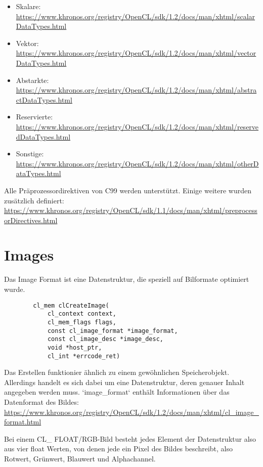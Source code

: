 		\begin{itemize}
		\item Skalare:\\ \url{https://www.khronos.org/registry/OpenCL/sdk/1.2/docs/man/xhtml/scalarDataTypes.html}
		\item Vektor:\\ \url{https://www.khronos.org/registry/OpenCL/sdk/1.2/docs/man/xhtml/vectorDataTypes.html}
		\item Abstarkte:\\ \url{https://www.khronos.org/registry/OpenCL/sdk/1.2/docs/man/xhtml/abstractDataTypes.html}
		\item Reservierte:\\ \url{https://www.khronos.org/registry/OpenCL/sdk/1.2/docs/man/xhtml/reservedDataTypes.html}
		\item Sonstige:\\ \url{https://www.khronos.org/registry/OpenCL/sdk/1.2/docs/man/xhtml/otherDataTypes.html}
		\end{itemize}		
		
		Alle Präprozessordirektiven von C99 werden unterstützt. Einige weitere wurden zusätzlich definiert:\\ \url{https://www.khronos.org/registry/OpenCL/sdk/1.1/docs/man/xhtml/preprocessorDirectives.html}		
		
		\section{Images}
		Das Image Format ist eine Datenstruktur, die speziell auf Bilformate optimiert wurde.
		\begin{lstlisting}
		cl_mem clCreateImage(
			cl_context context, 
			cl_mem_flags flags,
			const cl_image_format *image_format,
			const cl_image_desc *image_desc,
			void *host_ptr,
			cl_int *errcode_ret)
		\end{lstlisting}		
		Das Erstellen funktionier ähnlich zu einem gewöhnlichen Speicherobjekt. Allerdings handelt es sich dabei um eine Datenstruktur, deren genauer Inhalt angegeben werden muss. \li`image_format` enthält Informationen über das Datenformat des Bildes: \url{https://www.khronos.org/registry/OpenCL/sdk/1.2/docs/man/xhtml/cl_image_format.html}
		
		Bei einem CL\_ FLOAT/RGB-Bild besteht jedes Element der Datenstruktur also aus vier float Werten, von denen jede ein Pixel des Bildes beschreibt, also Rotwert, Grünwert, Blauwert und Alphachannel.
		
